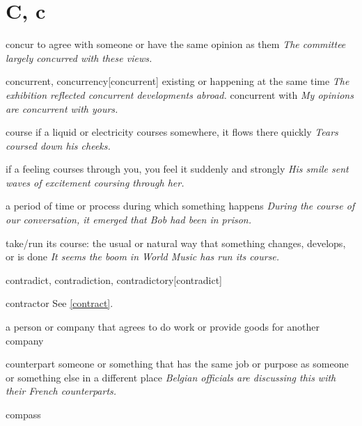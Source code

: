 \section{C, c}

\begin{word}{concur}
    to agree with someone or have the same opinion as them
    \textit{The committee largely concurred with these views.}
\end{word}

\begin{word}{concurrent, concurrency}[concurrent]
    existing or happening at the same time
    \textit{The exhibition reflected concurrent developments abroad.}
    concurrent with
    \textit{My opinions are concurrent with yours.}
\end{word}

\begin{word}{course}
    if a liquid or electricity courses somewhere, it flows there quickly
    \textit{Tears coursed down his cheeks.}

    if a feeling courses through you, you feel it suddenly and strongly
    \textit{His smile sent waves of excitement coursing through her.}

    a period of time or process during which something happens
    \textit{During the course of our conversation, it emerged that Bob had been in prison.}

    take/run its course: the usual or natural way that something changes, develops, or is done
    \textit{It seems the boom in World Music has run its course.}
\end{word}

\begin{word}{contradict, contradiction, contradictory}[contradict]
\end{word}

\begin{word}{contractor}
    See \ref{contract}.

    a person or company that agrees to do work or provide goods for another company
\end{word}


\begin{word}{counterpart}
    someone or something that has the same job or purpose as someone or something else in a different place
    \textit{Belgian officials are discussing this with their French counterparts.}
\end{word}

\begin{word}{compass}
\end{word}

